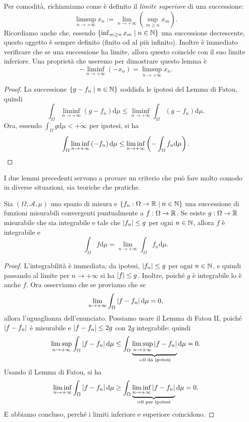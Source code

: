 Per comodità, richiamiamo come è definito il {\em limite superiore} di una successione:
\[\limsup_{n \to +\infty} x_n := \lim_{n \to +\infty} \left(\sup_{m \ge n} x_m\right) .\]
Ricordiamo anche che, essendo \(\left\{\inf_{m \ge n} x_m \mid n \in \mathbb N\right\}\) una successione decrescente, questo oggetto è sempre definito (finito od al più infinito). Inoltre è immediato verificare che se una successione ha limite, allora questo coincide con il suo limite inferiore. Una proprietà che useremo per dimostrare questo lemma è
\[- \liminf_{n \to +\infty}\left( -x_n\right) = \limsup_{n \to +\infty} x_n . \]

\begin{proof}
La successione \(\left\{g-f_n \mid n \in \mathbb N\right\}\) soddisfa le ipotesi del Lemma di Fatou, quindi
\[\int_\Omega \liminf_{n \to +\infty}\left( g-f_n \right) \mathrm d \mu \le \liminf_{n \to +\infty} \int_\Omega \left( g-f_n \right) \mathrm d \mu .\]
Ora, essendo \(\int_\Omega g \mathrm d \mu < +\infty\) per ipotesi, si ha
\[\int_\Omega \liminf_{n \to +\infty}\left( -f_n \right) \mathrm d \mu \le \liminf_{n \to +\infty}  \left(- \int_\Omega f_n \mathrm d \mu \right) . \qedhere\]
\end{proof}

I due lemmi precedenti servono a provare un criterio che può fare molto comodo in diverse situazioni, sia teoriche che pratiche.

\begin{proposizione}
Sia \((\Omega, \mathcal A, \mu)\) uno spazio di misura e \(\left\{f_n : \Omega \to \mathbb R \mid n \in \mathbb N\right\}\) una successione di funzioni misurabili convergenti puntualmente a \(f : \Omega \to \mathbb R\). Se esiste \(g : \Omega \to \mathbb R\) misurabile che sia integrabile e tale che \(\left\lvert f_n\right\rvert \le g\) per ogni \(n \in \mathbb N\), allora \(f\) è integrabile e
\[\int_\Omega f \mathrm d \mu = \lim_{n \to +\infty} \int_\Omega f_n \mathrm d \mu .\]
\end{proposizione}

\begin{proof}
L'integrabilità è immediata: da ipotesi, \(\left\lvert f_n\right\rvert \le g\) per ogni \(n \in \mathbb N\), e quindi passando al limite per \(n \to +\infty\) si ha \(\left\lvert f\right\rvert \le g\). Inoltre, poiché \(g\) è integrabile lo è anche \(f\). Ora osserviamo che se proviamo che se
\[\lim_{n \to +\infty} \int_{\Omega} \left\lvert f-f_n\right\rvert \mathrm d \mu = 0 ,\]
allora l'uguaglianza dell'enunciato. Possiamo usare il Lemma di Fatou II, poiché \(\left\lvert f-f_n\right\rvert\) è misurabile e \(\left\lvert f-f_n\right\rvert \le 2g\) con \(2g\) integrabile: quindi
\[\limsup_{n \to +\infty} \int_\Omega \left\lvert f-f_n\right\rvert \mathrm d \mu \le \int_\Omega \underbrace{\limsup_{n \to +\infty} \left\lvert f-f_n\right\rvert}_{= 0 \text{ da ipotesi}} \mathrm d \mu = 0 .\]
Usando il Lemma di Fatou, si ha
\[\liminf_{n \to +\infty} \int_\Omega \left\lvert f-f_n\right\rvert \mathrm d \mu \ge \int_\Omega \underbrace{\liminf_{n \to +\infty} \left\lvert f-f_n\right\rvert}_{= 0 \text{ per ipotesi}} \mathrm d \mu = 0 . \] E abbiamo concluso, perché i limiti inferiore e superiore coincidono.
\end{proof}
